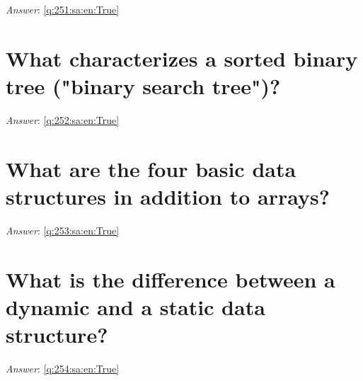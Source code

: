 \documentclass[a4paper,11pt,oneside]{book}
\begin{document}
\begin{sloppypar}
\label{q:251:sa:en:False}

\vspace{2cm}

\noindent\makebox[\textwidth]{\hrulefill}

\vspace{1cm}

\textit{Answer}: \autoref{q:251:sa:en:True}



\section{What characterizes a sorted binary tree ("binary search tree")?}

\label{q:252:sa:en:False}

\vspace{2cm}

\noindent\makebox[\textwidth]{\hrulefill}

\vspace{1cm}

\textit{Answer}: \autoref{q:252:sa:en:True}



\section{What are the four basic data structures in addition to arrays?}

\label{q:253:sa:en:False}

\vspace{2cm}

\noindent\makebox[\textwidth]{\hrulefill}

\vspace{1cm}

\textit{Answer}: \autoref{q:253:sa:en:True}



\section{What is the difference between a dynamic and a static data structure?}

\label{q:254:sa:en:False}

\vspace{2cm}

\noindent\makebox[\textwidth]{\hrulefill}

\vspace{1cm}

\textit{Answer}: \autoref{q:254:sa:en:True}




\end{sloppypar}
\end{document}
